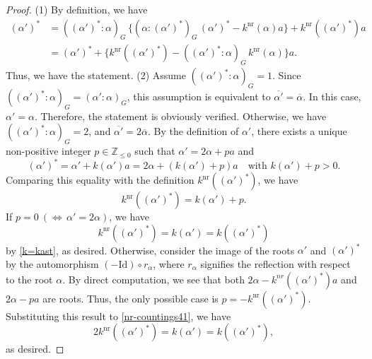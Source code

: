 \documentclass[11pt]{amsart}
\newcommand{\Z}{\mathbb{Z}}
\newcommand{\nr}{\mathrm{nr}}
\begin{document}
{\begin{proof}
(1) By definition, we have
\[\begin{aligned}
(\alpha')^\ast&=
((\alpha')^\ast:\alpha)_G\,
\big\{(\alpha:(\alpha')^\ast)_G\,(\alpha')^\ast-k^{\nr}(\alpha)a\big\} 
+ k^{\nr}((\alpha')^\ast)a\\
&=(\alpha')^\ast+\big\{k^{\nr}((\alpha')^\ast)
-((\alpha')^\ast:\alpha)_G \, k^{\nr}(\alpha)\big\}a.
\end{aligned}\] 
Thus, we have the statement.
\vskip 1mm
\noindent
(2) Assume $((\alpha')^\ast:\alpha)_G=1$. Since 
$((\alpha')^\ast:\alpha)_G=(\alpha':\alpha)_G$, this assumption is equivalent to
$\overline{\alpha'}=\overline{\alpha}$. In this case, $\alpha'=\alpha$. Therefore, 
the statement is obviously verified. Otherwise, we have 
$((\alpha')^\ast:\alpha)_G=2$, and 
$\overline{\alpha'}=2\overline{\alpha}$. 
By the definition of $\alpha'$, 
there exists a unique non-positive integer $p\in\Z_{\leq 0}$ such that
$\alpha'=2\alpha+pa$ and 
\begin{equation*}%
(\alpha')^\ast=\alpha'+k(\alpha')a=2\alpha+(k(\alpha')+p)a\quad
\text{with }k(\alpha')+p>0.
\end{equation*}
Comparing %
this equality with the definition $k^{\mathrm{nr}}((\alpha')^\ast)$, we have
\begin{equation}\label{nr-countings41}
k^{\mathrm{nr}}((\alpha')^\ast)=k(\alpha')+p.
\end{equation}
If $p=0\ (\Longleftrightarrow\, \alpha'=2\alpha)$, we have
\[k^{\mathrm{nr}}((\alpha')^\ast)=k(\alpha')=k((\alpha')^\ast)\]
by  \eqref{k=kast}, as desired. Otherwise, consider the image of the roots $\alpha'$ 
and $(\alpha')^\ast$ by the automorphism $(-\mathrm{Id}) \circ r_{\alpha}$, where 
$r_{\alpha}$ signifies the reflection with respect to the root $\alpha$. 
By direct computation, we see that both
$2\alpha-k^{nr}((\alpha')^\ast)a$ and $2\alpha-pa$ are roots. 
Thus, the only possible case is $p=-k^{\mathrm{nr}}((\alpha')^\ast)$. 
Substituting this result to \eqref{nr-countings41}, we have
\[2k^{\mathrm{nr}}((\alpha')^\ast)=k(\alpha')=k((\alpha')^*),\]
as desired.  
\end{proof} 

}
\end{document}
